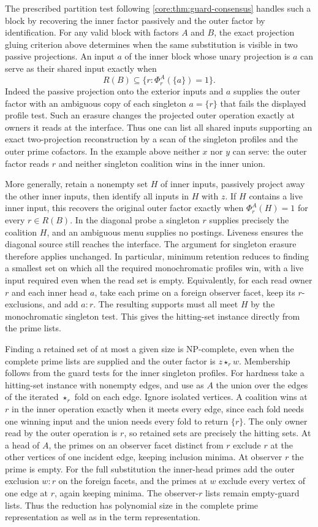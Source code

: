 The prescribed partition test following
\cref{core:thm:guard-consensus} handles such a block by recovering
the inner factor passively and the outer factor by identification.
For any valid block with factors $A$ and $B$, the exact projection
gluing criterion above determines when the same substitution is
visible in two passive projections. An input $a$ of the inner
block whose unary projection is $a$ can serve as their shared
input exactly when
\[
  R(B)\subseteq \{r:\Phi_r^A(\{a\})=1\}.
\]
Indeed the passive projection onto the exterior inputs and $a$
supplies the outer factor with an ambiguous copy of each singleton
$a=\{r\}$ that fails the displayed profile test. Such an erasure
changes the projected outer operation exactly at owners it reads
at the interface. Thus one can list all shared inputs supporting
an exact two-projection reconstruction by a scan of the singleton
profiles and the outer prime cofactors. In the example above
neither $x$ nor $y$ can serve: the outer factor reads $r$ and
neither singleton coalition wins in the inner union.

More generally, retain a nonempty set $H$ of inner inputs,
passively project away the other inner inputs, then identify all
inputs in $H$ with $z$. If $H$ contains a live inner input, this
recovers the original outer factor exactly when
$\Phi_r^A(H)=1$ for every $r\in R(B)$. In the diagonal probe a
singleton $r$ supplies precisely the coalition $H$, and an
ambiguous menu supplies no postings. Liveness ensures the
diagonal source still reaches the interface. The argument for
singleton erasure therefore applies unchanged. In particular,
minimum retention reduces to finding a smallest set on which
all the required monochromatic profiles win, with a live input
required even when the read set is empty.
Equivalently, for each read owner $r$ and each inner head $a$,
take each prime on a foreign observer facet, keep its $r$-exclusions,
and add $a:r$. The resulting supports must all meet $H$ by the
monochromatic singleton test. This gives the hitting-set instance
directly from the prime lists.

Finding a retained set of at most a given size is NP-complete,
even when the complete prime lists are supplied and the outer
factor is $z\star_r w$. Membership follows from the guard tests
for the inner singleton profiles. For hardness take a hitting-set
instance with nonempty edges, and use as $A$ the union over the
edges of the iterated $\star_r$ fold on each edge. Ignore isolated
vertices. A coalition wins at $r$ in the inner operation exactly
when it meets every edge, since each fold needs one winning input
and the union needs every fold to return $\{r\}$. The only owner
read by the outer operation is $r$, so retained sets are precisely
the hitting sets. At a head of $A$, the primes on an observer
facet distinct from $r$ exclude $r$ at the other vertices of one
incident edge, keeping inclusion minima. At observer $r$ the
prime is empty. For the full substitution the inner-head primes
add the outer exclusion $w:r$ on the foreign facets, and the
primes at $w$ exclude every vertex of one edge at $r$, again
keeping minima. The observer-$r$ lists remain empty-guard lists.
Thus the reduction has polynomial size in the complete prime
representation as well as in the term representation.

